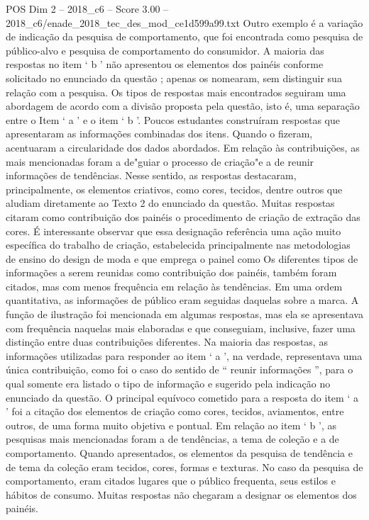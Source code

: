 \begin{textsample}{POS Dim 2 – 2018\_c6 – Score 3.00 – 2018\_c6/enade\_2018\_tec\_des\_mod\_ce1d599a99.txt}
Outro exemplo é a variação de indicação da pesquisa de comportamento, que foi encontrada como pesquisa de público-alvo e pesquisa de comportamento do consumidor.
A maioria das respostas no item ‘ b ’ não apresentou os elementos dos painéis conforme solicitado no enunciado da questão ; apenas os nomearam, sem distinguir sua relação com a pesquisa.
Os tipos de respostas mais encontrados seguiram uma abordagem de acordo com a divisão proposta pela questão, isto é, uma separação entre o Item ‘ a ’ e o item ‘ b ’.
Poucos estudantes construíram respostas que apresentaram as informações combinadas dos itens.
Quando o fizeram, acentuaram a circularidade dos dados abordados.
Em relação às contribuições, as mais mencionadas foram a de"guiar o processo de criação"e a de reunir informações de tendências.
Nesse sentido, as respostas destacaram, principalmente, os elementos criativos, como cores, tecidos, dentre outros que aludiam diretamente ao Texto 2 do enunciado da questão.
Muitas respostas citaram como contribuição dos painéis o procedimento de criação de extração das cores.
É interessante observar que essa designação referência uma ação muito específica do trabalho de criação, estabelecida principalmente nas metodologias de ensino do design de moda e que emprega o painel como Os diferentes tipos de informações a serem reunidas como contribuição dos painéis, também foram citados, mas com menos frequência em relação às tendências.
Em uma ordem quantitativa, as informações de público eram seguidas daquelas sobre a marca.
A função de ilustração foi mencionada em algumas respostas, mas ela se apresentava com frequência naquelas mais elaboradas e que conseguiam, inclusive, fazer uma distinção entre duas contribuições diferentes.
Na maioria das respostas, as informações utilizadas para responder ao item ‘ a ’, na verdade, representava uma única contribuição, como foi o caso do sentido de “ reunir informações ”, para o qual somente era listado o tipo de informação e sugerido pela indicação no enunciado da questão.
O principal equívoco cometido para a resposta do item ‘ a ’ foi a citação dos elementos de criação como cores, tecidos, aviamentos, entre outros, de uma forma muito objetiva e pontual.
Em relação ao item ‘ b ’, as pesquisas mais mencionadas foram a de tendências, a tema de coleção e a de comportamento.
Quando apresentados, os elementos da pesquisa de tendência e de tema da coleção eram tecidos, cores, formas e texturas.
No caso da pesquisa de comportamento, eram citados lugares que o público frequenta, seus estilos e hábitos de consumo.
Muitas respostas não chegaram a designar os elementos dos painéis.

\end{textsample}
